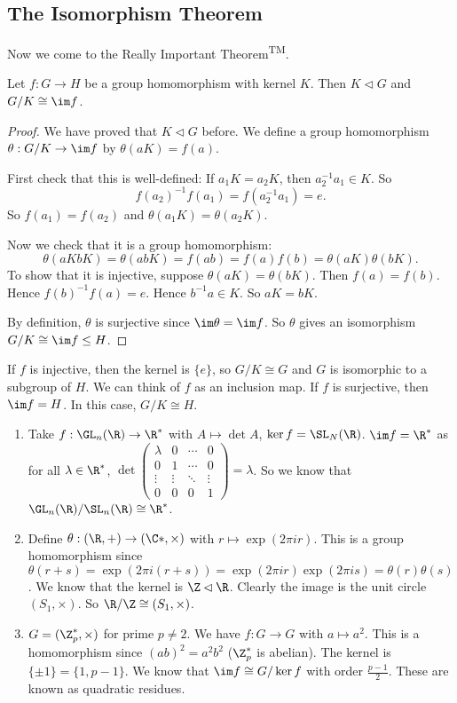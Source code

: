 \documentclass[a4paper]{article}
\begin{document}
\subsection{The Isomorphism Theorem}
Now we come to the Really Important Theorem\textsuperscript{TM}.
\begin{thm}
  Let $f:G\to H$ be a group homomorphism with kernel $K$. Then $K\lhd G$ and $G/K\cong \im f$.
\end{thm}

\begin{proof}
  We have proved that $K\lhd G$ before. We define a group homomorphism $\theta: G/K\to \im f$ by $\theta(aK) = f(a)$.

  First check that this is well-defined: If $a_1K = a_2K$, then $a_2^{-1}a_1\in K$. So
  \[
    f(a_2)^{-1}f(a_1) = f(a_2^{-1}a_1) = e.
  \]
  So $f(a_1) = f(a_2)$ and $\theta(a_1K) = \theta(a_2 K)$.

  Now we check that it is a group homomorphism:
  \[
    \theta(aKbK) = \theta(abK) = f(ab) = f(a)f(b) = \theta(aK) \theta(bK).
  \]
  To show that it is injective, suppose $\theta(aK) = \theta(bK)$. Then $f(a) = f(b)$. Hence $f(b)^{-1}f(a) = e$. Hence $b^{-1}a \in K$. So $aK = bK$.

  By definition, $\theta$ is surjective since $\im \theta = \im f$. So $\theta$ gives an isomorphism $G/K \cong \im f \leq H$.
\end{proof}
If $f$ is injective, then the kernel is $\{e\}$, so $G/K\cong G$ and $G$ is isomorphic to a subgroup of $H$. We can think of $f$ as an inclusion map. If $f$ is surjective, then $\im f = H$. In this case, $G/K \cong H$.

\begin{eg}\leavevmode
  \begin{enumerate}
    \item Take $f: \GL_n(\R) \to \R^*$ with $A \mapsto \det A$, $\ker f = \SL_N(\R)$. $\im f = \R^*$ as for all $\lambda \in \R^*$, $\det
      \begin{pmatrix}
        \lambda & 0 & \cdots & 0 \\
        0 &1 & \cdots & 0\\
        \vdots &\vdots &\ddots & \vdots\\
        0& 0 & 0 &1
      \end{pmatrix}
      = \lambda$. So we know that $\GL_n(\R)/\SL_n(\R) \cong \R^*$.
    \item Define $\theta: (\R, +) \to (\C*, \times)$ with $r\mapsto \exp(2\pi ir)$. This is a group homomorphism since $\theta(r + s) = \exp(2\pi i(r + s)) = \exp (2\pi i r)\exp (2\pi i s) = \theta(r)\theta(s)$. We know that the kernel is $\Z\lhd \R$. Clearly the image is the unit circle $(S_1, \times)$. So $\R/\Z \cong (S_1, \times)$.
    \item $G = (\Z_p^*, \times)$ for prime $p\not= 2$. We have $f: G\to G$ with $a\mapsto a^2$. This is a homomorphism since $(ab)^2 = a^2b^2$ ($\Z_p^*$ is abelian). The kernel is $\{\pm 1\} = \{1, p - 1\}$. We know that $\im f\cong G/\ker f$ with order $\frac{p - 1}{2}$. These are known as quadratic residues.
  \end{enumerate}
\end{eg}
\end{document}
